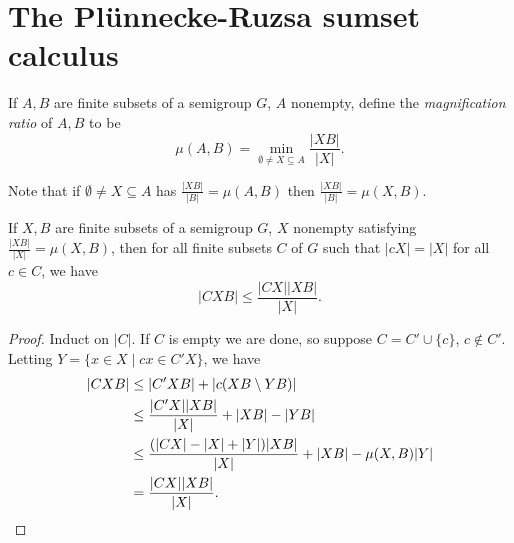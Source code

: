 \begin{comment}
\documentclass[letterpaper,11pt]{article}
\usepackage{amsfonts,amssymb,amsmath,amsthm,latexsym}
\usepackage{stmaryrd}
\usepackage[all]{xy}
\usepackage{fullpage}
\usepackage{hyperref}

\newtheorem{thm}{Theorem}
\newtheorem{lem}{Lemma}
\newtheorem{cor}{Corollary}
\newtheorem{prop}{Proposition}

\theoremstyle{definition}
\newtheorem{defn}{Definition}

\theoremstyle{remark}
\newtheorem{ex}{Example}
\newtheorem{rmk}{Remark}
\newtheorem{exer}{Exercise}



\newcommand{\CC}{\mathbb{C}}
\newcommand{\FF}{\mathbb{F}}
\newcommand{\HH}{\mathbb{H}}
\newcommand{\NN}{\mathbb{N}}
\newcommand{\PP}{\mathbb{P}}
\newcommand{\RR}{\mathbb{R}}
\newcommand{\ZZ}{\mathbb{Z}}

\newcommand{\cK}{\mathcal{K}}
\newcommand{\cL}{\mathcal{L}}
\newcommand{\cO}{\mathcal{O}}

\title{Notes on the sum product theorem}
\date{}
\maketitle

\tableofcontents
\end{comment}

\section{The Pl\"unnecke-Ruzsa sumset calculus}

\begin{defn} If $A,B$ are finite subsets of a semigroup $G$, $A$ nonempty, define the \emph{magnification ratio} of $A,B$ to be
\[
\mu(A,B) = \min_{\emptyset \ne X\subseteq A} \frac{|XB|}{|X|}.
\]
\end{defn}

Note that if $\emptyset \ne X\subseteq A$ has $\frac{|XB|}{|B|} = \mu(A,B)$ then $\frac{|XB|}{|B|} = \mu(X,B)$.

\begin{thm}[Petridis]\label{petridis} If $X,B$ are finite subsets of a semigroup $G$, $X$ nonempty satisfying $\frac{|XB|}{|X|} = \mu(X,B)$, then for all finite subsets $C$ of $G$ such that $|cX| = |X|$ for all $c\in C$, we have
\[
|CXB| \le \frac{|CX||XB|}{|X|}.
\]
\end{thm}
\begin{proof} Induct on $|C|$. If $C$ is empty we are done, so suppose $C = C' \cup \{c\}$, $c \not\in C'$. Letting $Y=\{x\in X\mid cx\in C'X\}$, we have
\begin{align*}
|CXB| &\le |C'XB| + |c(XB\setminus YB)|\\
&\le \frac{|C'X||XB|}{|X|} + |XB| - |YB|\\
&\le \frac{(|CX|-|X|+|Y|)|XB|}{|X|} +|XB| - \mu(X,B)|Y|\\
&= \frac{|CX||XB|}{|X|}.\qedhere
\end{align*}
\end{proof}

